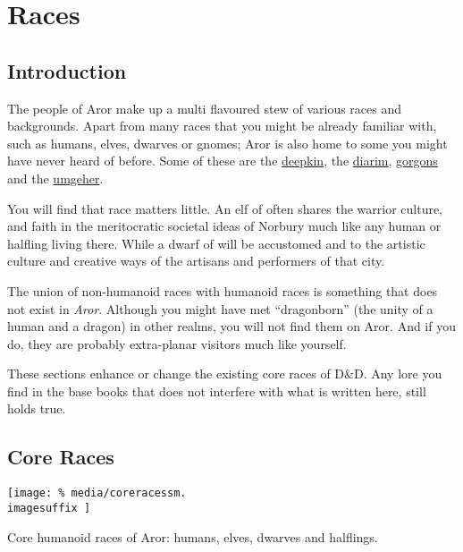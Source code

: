 \chapter{Races}
\label{sec:Races}

\section{Introduction}

The people of Aror make up a multi flavoured stew of various races and
backgrounds. Apart from many races that you might be already familiar with,
such as humans, elves, dwarves or gnomes; Aror is also home to some you might
have never heard of before. Some of these are the
\hyperref[sec:Deepkin]{deepkin}, the \hyperref[sec:Diarim]{diarim},
\hyperref[sec:Gorgons]{gorgons} and the \hyperref[sec:Umgeher]{umgeher}.

You will find that race matters little. An elf of  often
shares the warrior culture, and faith in the meritocratic societal ideas
of Norbury much like any human or halfling living there. While a dwarf of
 will be accustomed and to the artistic culture and
creative ways of the artisans and performers of that city.

The union of non-humanoid races with humanoid races is something that does not
exist in \emph{Aror}. Although you might have met ``dragonborn'' (the unity of
a human and a dragon) in other realms, you will not find them on Aror. And if
you do, they are probably extra-planar visitors much like yourself.

\begin{note}
  These sections enhance or change the existing core races of D\&D. Any lore
  you find in the base books that does not interfere with what is written
  here, still holds true.
\end{note}

\section{Core Races}
\label{sec:Core Races}

\ifimages
\begin{figure*}[ht!]
    \centering
    \vspace{-2.6cm}
    \centerline{
      \texttt{[image: \%
        media/coreracessm.\\imagesuffix
      ]}
    }
    \par
    Core humanoid races of Aror: humans, elves, dwarves and halflings.
\end{figure*}
\fi

